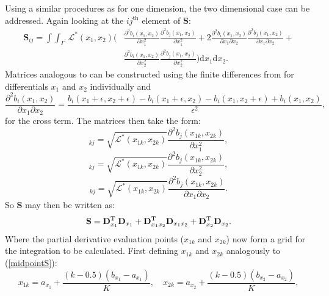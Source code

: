 Using a similar procedures as for one dimension, the two dimensional case can be addressed. Again looking at the $ij^\text{th}$ element of $\mathbf{S}$:
\begin{align*}
\mathbf{S}_{ij}= \int\int_{\Gamma^\prime} \mathcal{L}^*(x_1,x_2) \Bigg ( & \frac{\partial^2 b_i(x_1,x_2)}{\partial x_1^2}\frac{\partial^2 b_j(x_1,x_2)}{\partial x_1^2}+2\frac{\partial^2 b_i(x_1,x_2)}{\partial x_1 \partial x_2}\frac{\partial^2 b_j(x_1,x_2)}{\partial x_1 \partial x_2}+ \\ 
& \frac{\partial^2 b_i(x_1,x_2)}{\partial x_2^2}\frac{\partial^2 b_j(x_1,x_2)}{\partial x_2^2} \Bigg )  \text{d}x_1\text{d}x_2.
\end{align*}
Matrices analogous to  can be constructed using the finite differences from  for differentials $x_1$ and $x_2$ individually and
\begin{equation*}
\frac{\partial^2 b_i(x_1,x_2)}{\partial x_1 \partial x_2} = \frac{ b_i(x_1+\epsilon,x_2+\epsilon) - b_i(x_1+\epsilon,x_2) - b_i(x_1,x_2+\epsilon) + b_i(x_1,x_2)}{\epsilon^2},
\end{equation*}
for the cross term. The matrices then take the form:
\begin{equation*}
[\mathbf{D}_{x_1}]_{kj}=\sqrt{\mathcal{L}^*(x_{1k},x_{2k})} \frac{\partial^2 b_j(x_{1k},x_{2k})}{\partial x_1^2},
\end{equation*}
\begin{equation*}
[\mathbf{D}_{x_2}]_{kj}=\sqrt{\mathcal{L}^*(x_{1k},x_{2k})} \frac{\partial^2 b_j(x_{1k},x_{2k})}{\partial x_2^2},
\end{equation*}
\begin{equation*}
[\mathbf{D}_{x_1 x_2}]_{kj}=\sqrt{\mathcal{L}^*(x_{1k},x_{2k})} \frac{\partial^2 b_j(x_{1k},x_{2k})}{\partial x_1 \partial x_2}.
\end{equation*}
So $\mathbf{S}$ may then be written as:
\begin{equation*}
\mathbf{S}=\mathbf{D}_{x_1}^{\text{T}}\mathbf{D}_{x_1} + \mathbf{D}_{x_1 x_2}^{\text{T}}\mathbf{D}_{x_1 x_2} + \mathbf{D}_{x_2}^{\text{T}}\mathbf{D}_{x_2}.
\end{equation*}
Where the partial derivative evaluation points ($x_{1k}$ and $x_{2k}$) now form a grid for the integration to be calculated. First defining $x_{1k}$ and $x_{2k}$ analogously to (\ref{midpointS}):
\begin{equation*}
x_{1k}=a_{x_1}+\frac{(k-0.5)(b_{x_1}-a_{x_1})}{K},\quad
x_{2k}=a_{x_2}+\frac{(k-0.5)(b_{x_2}-a_{x_2})}{K},
\end{equation*}
